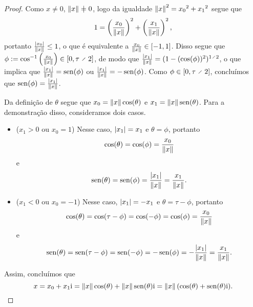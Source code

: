 \begin{proof}
Como $x \neq 0$, $\nor{x} \neq 0$, logo da igualdade $\left\Vert{x}\right\Vert^2 = {x_0}^2 + {x_1}^2$ segue que
	\begin{equation*}
	1 = \left(\frac{x_0}{\left\Vert{x}\right\Vert}\right)^2 + \left(\frac{x_1}{\left\Vert{x}\right\Vert}\right)^2,
	\end{equation*}
portanto $\frac{\left\vert{x_0}\right\vert}{\left\Vert{x}\right\Vert} \leq 1$, o que é equivalente a $\frac{x_0}{\left\Vert{x}\right\Vert} \in \left[-1,\allowbreak 1\right]$. Disso segue que $\phi := \cos\inv\left(\frac{x_0}{\nor{x}}\right) \in \intff{0}{\tau \div 2}$, de modo que $\frac{\abs{x_1}}{\nor{x}} = (1-(\cos(\phi))^2)^{1 \div 2}$, o que implica que $\frac{\left\vert{x_1}\right\vert}{\left\Vert{x}\right\Vert} = \operatorname{sen}(\phi)$ ou $\frac{\left\vert{x_1}\right\vert}{\left\Vert{x}\right\Vert} = -\operatorname{sen}(\phi)$. Como $\phi \in \intff{0}{\tau \div 2}$, concluímos que $\operatorname{sen}(\phi) = \frac{\left\vert{x_1}\right\vert}{\left\Vert{x}\right\Vert}$.

Da definição de $\theta$ segue que $x_0 = \left\Vert{x}\right\Vert\cos(\theta)$ e $x_1 = \left\Vert{x}\right\Vert\operatorname{sen}(\theta)$. Para a demonstração disso, consideramos dois casos.
	\begin{itemize}
	\item ($x_1 > 0$ ou $x_0 = 1$) Nesse caso, $\left\vert{x_1}\right\vert=x_1$ e $\theta = \phi$, portanto
		\begin{equation*}
		\cos(\theta) = \cos(\phi) = \frac{x_0}{\left\Vert{x}\right\Vert}
		\end{equation*}
	e
		\begin{equation*}
		\operatorname{sen}(\theta) = \operatorname{sen}(\phi) = \frac{\left\vert{x_1}\right\vert}{\left\Vert{x}\right\Vert} = \frac{x_1}{\left\Vert{x}\right\Vert}.
		\end{equation*}

	\item ($x_1 < 0$ ou $x_0 = -1$) Nesse caso, $\left\vert{x_1}\right\vert=-x_1$ e $\theta = \tau - \phi$, portanto
		\begin{equation*}
		\cos(\theta) = \cos(\tau - \phi) = \cos(-\phi) = \cos (\phi)= \frac{x_0}{\left\Vert{x}\right\Vert}
		\end{equation*}
	e
		\begin{equation*}
		\operatorname{sen}(\theta) = \operatorname{sen}(\tau - \phi) = \operatorname{sen}(-\phi) = -\operatorname{sen}(\phi) = -\frac{\left\vert{x_1}\right\vert}{\left\Vert{x}\right\Vert} = \frac{x_1}{\left\Vert{x}\right\Vert}.
		\end{equation*}
	\end{itemize}

Assim, concluímos que
	\begin{equation*}
	x = x_0 + x_1 \mathrm{i} = \left\Vert{x}\right\Vert\cos(\theta) + \left\Vert{x}\right\Vert\operatorname{sen}(\theta) \mathrm{i} = \left\Vert{x}\right\Vert(\cos(\theta) + \operatorname{sen}(\theta) \mathrm{i}).
	\qedhere
	\end{equation*}
\end{proof}

